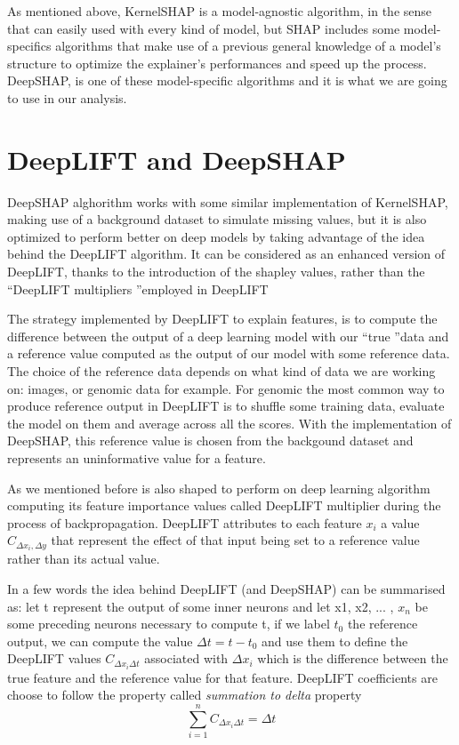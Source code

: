 \documentclass[11pt]{report}
\begin{document}

As mentioned above, KernelSHAP is a model-agnostic algorithm, in the sense that can easily used with every kind of model, but SHAP includes some model-specifics algorithms that make use of a previous general knowledge of a model's structure to optimize the explainer's performances and speed up the process. DeepSHAP, is one of these model-specific algorithms and it is what we are going to use in our analysis.

\section{DeepLIFT and DeepSHAP}
DeepSHAP alghorithm works with some similar implementation of KernelSHAP, making use of a background dataset to simulate missing values, but it is also optimized to perform better on deep models by taking advantage of the idea behind the DeepLIFT algorithm.
It can be considered as an enhanced version of DeepLIFT, thanks to the introduction of the shapley values, rather than the \textquotedblleft DeepLIFT multipliers \textquotedblright employed in DeepLIFT

The strategy implemented by DeepLIFT to explain features, is to compute the difference between the output of a deep learning model with our \textquotedblleft true  \textquotedblright data and a reference value computed as the output of our model with some reference data.
The choice of the reference data depends on what kind of data we are working on: images, or genomic data for example.
For genomic the most common way to produce reference output in DeepLIFT is to shuffle some training data, evaluate the model on them and average across all the scores.
With the implementation of DeepSHAP, this reference value is chosen from the backgound dataset and represents an uninformative value for a feature.

As we mentioned before is also shaped to perform on deep learning algorithm computing its feature importance values called DeepLIFT multiplier during the process of backpropagation.
DeepLIFT attributes to each feature $x_i$ a value $C_{\Delta x_i, \Delta y}$ that represent the effect of that input being set to a reference value rather than its actual value.

In a few words the idea behind DeepLIFT (and DeepSHAP) can be summarised as: let t represent the output of some inner neurons and let x1, x2, ... , $x_n$ be some preceding neurons necessary to compute t, if we label $t_0$ the reference output, we can compute the value $\Delta t = t-t_0$ and use them to define the DeepLIFT values $C_{\Delta x_i \Delta t}$ associated with $\Delta x_i$ which is the difference between the true feature and the reference value for that feature.
DeepLIFT coefficients are choose to follow the property called \emph{summation to delta} property
\[
\sum_{i = 1} ^n C_{\Delta x_i \Delta t} = \Delta t
\]
\end{document}
